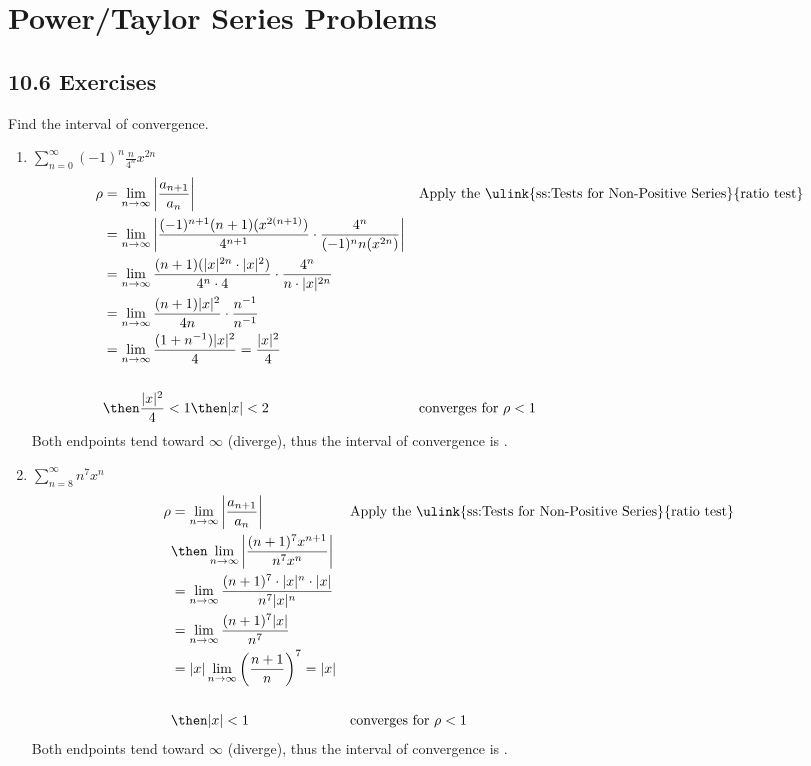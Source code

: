 \section{Power/Taylor Series Problems}

\subsection{10.6 Exercises}
Find the interval of convergence.

\begin{enumerate}[itemsep=24em]
  \item \(\displaystyle \sum_{n=0}^{\infty}  (-1)^n \frac{n}{4^n}x^{2n} \)
    \begin{align*}
      \rho &= \lim_{n \to \infty} \left| \frac{a_{n+1}}{a_n}  \right|
           && \text{Apply the \ulink{ss:Tests for Non-Positive Series}{ratio test}} \\
      &= \lim_{n \to \infty}
      \left|  \frac{(-1)^{n+1}(n+1)(x^{2(n+1)})}{4^{n+1}}
      \cdot
        \frac{4^n}{(-1)^{n}n(x^{2n})}
      \right| \\
      &= \lim_{n \to \infty}
      \frac{(n+1)(|x|^{2n} \cdot |x|^2)}{4^n \cdot 4}
      \cdot
      \frac{4^n}{n\cdot |x|^{2n}} \\
      &= \lim_{n \to \infty}
      \frac{(n+1)|x|^2}{4n} \cdot \frac{n^{-1}}{n^{-1}} \\
      &= \lim_{n \to \infty}
      \frac{(1+n^{-1})|x|^2}{4} = \frac{|x|^2}{4} \\\\
      &\then \frac{|x|^2}{4} < 1
      \then |x| < 2
      && \text{converges for}~\rho < 1
    \end{align*}
    Both endpoints tend toward \(\infty \) (diverge), thus the
    interval of convergence is .

  \vspace{-22em}
  \item \(\displaystyle \sum_{n=8}^{\infty} n^7 x^n \)
    \begin{align*}
      \rho &= \lim_{n \to \infty} \left| \frac{a_{n+1}}{a_n}  \right|
           && \text{Apply the \ulink{ss:Tests for Non-Positive Series}{ratio test}} \\
      &\then \lim_{n \to \infty}  \left| \frac{(n+1)^7 x^{n+1}}{n^7x^n} \right| \\
      &= \lim_{n \to \infty}  \frac{(n+1)^7 \cdot |x|^n \cdot |x|}{n^7|x|^n} \\
      &= \lim_{n \to \infty}  \frac{(n+1)^7|x|}{n^7}\\
      &= |x| \lim_{n \to \infty}  \left(\frac{n+1}{n}\right)^{7}  = |x| \\
      \\
      &\then |x| < 1
      && \text{converges for}~\rho < 1
    \end{align*}
    Both endpoints tend toward \(\infty\) (diverge), thus the
    interval of convergence is .



\end{enumerate}
